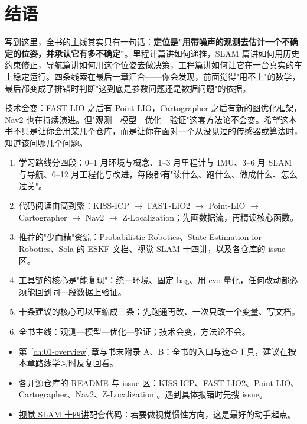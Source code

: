 \section{结语}\label{sec:30-end}

写到这里，全书的主线其实只有一句话：\textbf{定位是"用带噪声的观测去估计一个不确定的位姿，并承认它有多不确定"}。里程计篇讲如何递推，SLAM 篇讲如何用历史约束修正，导航篇讲如何用这个位姿去做决策，工程篇讲如何让它在一台真实的车上稳定运行。四条线索在最后一章汇合——你会发现，前面觉得"用不上"的数学，最后都变成了排错时判断"这到底是参数问题还是数据问题"的依据。

技术会变：FAST-LIO 之后有 Point-LIO，Cartographer 之后有新的图优化框架，Nav2 也在持续演进。但"观测—模型—优化—验证"这套方法论不会变。希望这本书不只是让你会用某几个仓库，而是让你在面对一个从没见过的传感器或算法时，知道该问哪几个问题。

\begin{summary}

\begin{enumerate}
  \item 学习路线分四段：0--1 月环境与概念、1--3 月里程计与 IMU、3--6 月 SLAM 与导航、6--12 月工程化与改进，每段都有"读什么、跑什么、做成什么、怎么过关"。
  \item 代码阅读由简到繁：KISS-ICP $\to$ FAST-LIO2 $\to$ Point-LIO $\to$ Cartographer $\to$ Nav2 $\to$ Z-Localization；先画数据流，再精读核心函数。
  \item 推荐的"少而精"资源：Probabilistic Robotics、State Estimation for Robotics、Sola 的 ESKF 文档、视觉 SLAM 十四讲，以及各仓库的 issue 区。
  \item 工具链的核心是"能复现"：统一环境、固定 bag、用 evo 量化，任何改动都必须能回到同一段数据上验证。
  \item 十条建议的核心可以压缩成三条：先跑通再改、一次只改一个变量、写文档。
  \item 全书主线：观测—模型—优化—验证；技术会变，方法论不会。
\end{enumerate}


\end{summary}

\begin{reading}

\begin{itemize}
  \item 第~\ref{ch:01-overview} 章与书末附录 A、B：全书的入口与速查工具，建议在按本章路线学习时反复回看。
  \item 各开源仓库的 README 与 issue 区：KISS-ICP、FAST-LIO2、Point-LIO、Cartographer、Nav2、Z-Localization \cite{zloc2026}。遇到具体报错时先搜 issue。
  \item \href{https://github.com/gaoxiang12/slambook2}{视觉 SLAM 十四讲}配套代码：若要做视觉惯性方向，这是最好的动手起点。
\end{itemize}


\end{reading}
